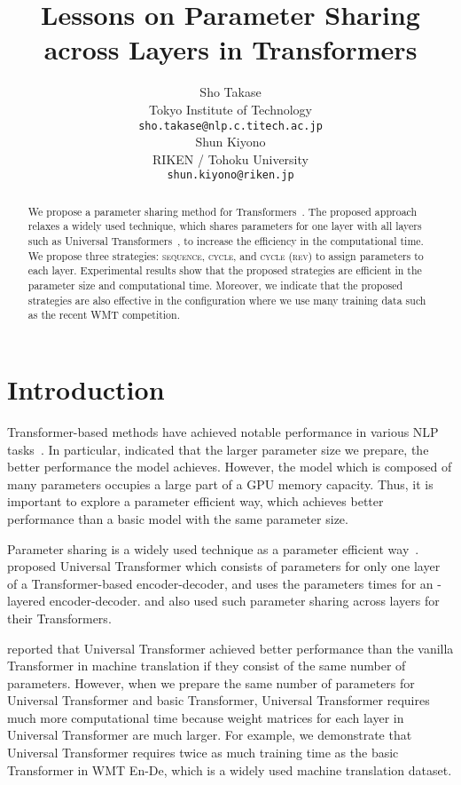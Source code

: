 \documentclass[11pt]{article}
\title{Lessons on Parameter Sharing across Layers in Transformers}
\author{Sho Takase \\
  Tokyo Institute of Technology \\
  \texttt{sho.takase@nlp.c.titech.ac.jp} \\\And
  Shun Kiyono \\
  RIKEN / Tohoku University \\
  \texttt{shun.kiyono@riken.jp} \\
 }
\begin{document}
\maketitle
\begin{abstract}
We propose a parameter sharing method for Transformers~\cite{NIPS2017_7181}.
The proposed approach relaxes a widely used technique, which shares parameters for one layer with all layers such as Universal Transformers~\cite{dehghani2019}, to increase the efficiency in the computational time.
We propose three strategies: \textsc{sequence}, \textsc{cycle}, and \textsc{cycle (rev)} to assign parameters to each layer.
Experimental results show that the proposed strategies are efficient in the parameter size and computational time.
Moreover, we indicate that the proposed strategies are also effective in the configuration where we use many training data such as the recent WMT competition.
\end{abstract}

\section{Introduction}
\label{sec:intro}
Transformer-based methods have achieved notable performance in various NLP tasks~\cite{NIPS2017_7181,devlin-etal-2019-bert,NEURIPS2020_1457c0d6}.
In particular,  indicated that the larger parameter size we prepare, the better performance the model achieves.
However, the model which is composed of many parameters occupies a large part of a GPU memory capacity.
Thus, it is important to explore a parameter efficient way, which achieves better performance than a basic model with the same parameter size.


Parameter sharing is a widely used technique as a parameter efficient way~\cite{dehghani2019,Dabre_Fujita_2019,lan2020}.
 proposed Universal Transformer which consists of parameters for only one layer of a Transformer-based encoder-decoder, and uses the parameters  times for an -layered encoder-decoder.
 and  also used such parameter sharing across layers for their Transformers.


 reported that Universal Transformer achieved better performance than the vanilla Transformer in machine translation if they consist of the same number of parameters.
However, when we prepare the same number of parameters for Universal Transformer and basic Transformer, Universal Transformer requires much more computational time because weight matrices for each layer in Universal Transformer are much larger.
For example, we demonstrate that Universal Transformer requires twice as much training time as the basic Transformer in WMT En-De, which is a widely used machine translation dataset.
\end{document}
